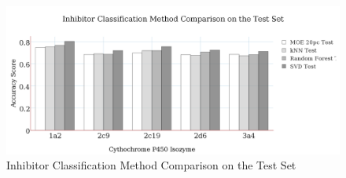 
\begin{figure}[!h]
\includegraphics[width=1\textwidth]{../img/method_comparison_test_set.png}
\caption{Inhibitor Classification Method Comparison on the Test Set}
\end{figure}






